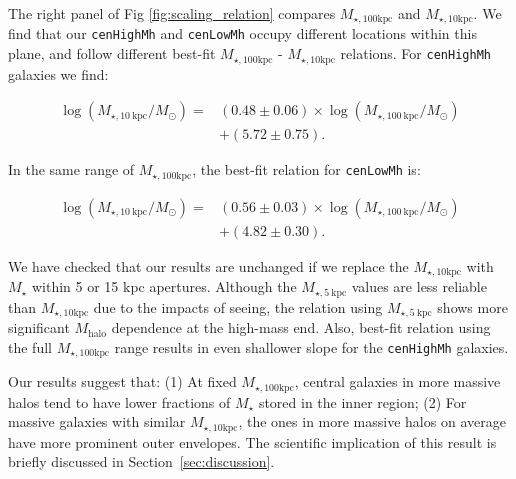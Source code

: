 \documentclass[a4paper,fleqn,usenatbib]{mnras}
\def\rbcg{\texttt{cenHighMh}}
\def\nbcg{\texttt{cenLowMh}}
\def\mstar{{$M_{\star}$}}
\def\mhalo{{$M_{\mathrm{halo}}$}}
\def\minn{{$M_{\star,10\mathrm{kpc}}$}}
\def\mtot{{$M_{\star,100\mathrm{kpc}}$}}
\begin{document}
    The right panel of Fig \ref{fig:scaling_relation} compares \mtot{} and \minn{}. 
    We find that our \rbcg{} and \nbcg{} occupy different locations within this plane,
    and follow different best-fit \mtot{} - \minn{} relations. 
    For \rbcg{} galaxies we find:
    
    \begin{equation}
        \begin{aligned}
        \log (M_{\star, 10\ \mathrm{kpc}}/M_{\odot}) = & (0.48\pm0.06) \times \log (M_{\star, 100\ \mathrm{kpc}}/M_{\odot}) \\ & +(5.72\pm0.75).
        \end{aligned}
    \end{equation}
    
    \noindent In the same range of \mtot{}, the best-fit relation for \nbcg{} is:
     
    \begin{equation}
        \begin{aligned}
        \log (M_{\star, 10\ \mathrm{kpc}}/M_{\odot}) = & (0.56\pm0.03) \times \log (M_{\star, 100\ \mathrm{kpc}}/M_{\odot}) \\ & +(4.82\pm0.30).
        \end{aligned}
    \end{equation}
    
    We have checked that our results are unchanged if we replace the \minn{} with 
    \mstar{} within 5 or 15 kpc apertures. 
    Although the $M_{\star, 5\ \mathrm{kpc}}$ values are less reliable than \minn{} 
    due to the impacts of seeing, the relation using $M_{\star, 5\ \mathrm{kpc}}$ shows 
    more significant \mhalo{} dependence at the high-mass end.
    Also, best-fit relation using the full \mtot{} range results in even shallower 
    slope for the \rbcg{} galaxies.
     
    Our results suggest that: 
    (1) At fixed \mtot{}, central galaxies in more massive halos tend to have 
    lower fractions of \mstar{} stored in the inner region; 
    (2) For massive galaxies with similar \minn{}, the ones in more massive halos on 
    average have more prominent outer envelopes. 
    The scientific implication of this result is briefly discussed in 
    Section~\ref{sec:discussion}.
\end{document}
